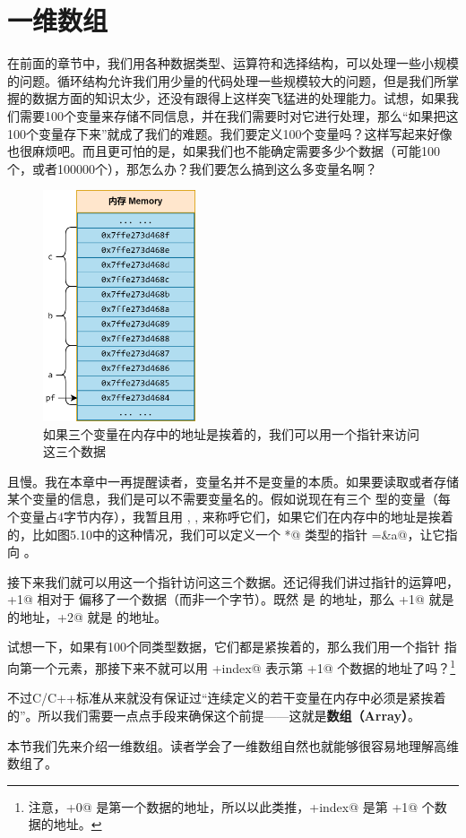 \section{一维数组}
在前面的章节中，我们用各种数据类型、运算符和选择结构，可以处理一些小规模的问题。循环结构允许我们用少量的代码处理一些规模较大的问题，但是我们所掌握的数据方面的知识太少，还没有跟得上这样突飞猛进的处理能力。试想，如果我们需要100个变量来存储不同信息，并在我们需要时对它进行处理，那么``如果把这100个变量存下来''就成了我们的难题。我们要定义100个变量吗？这样写起来好像也很麻烦吧。而且更可怕的是，如果我们也不能确定需要多少个数据（可能100个，或者100000个），那怎么办？我们要怎么搞到这么多变量名啊？\par
\begin{figure}[htbp]
    \centering
    \includegraphics[width=0.4\textwidth]{../images/generalized_parts/05_variables_one_by_one_in_memory.drawio.png}
    \caption{如果三个变量在内存中的地址是挨着的，我们可以用一个指针来访问这三个数据}
\end{figure}
且慢。我在本章中一再提醒读者，变量名并不是变量的本质。如果要读取或者存储某个变量的信息，我们是可以不需要变量名的。假如说现在有三个 \lstinline@float@ 型的变量（每个变量占4字节内存），我暂且用 \lstinline@a@, \lstinline@b@, \lstinline@c@ 来称呼它们，如果它们在内存中的地址是挨着的，比如图5.10中的这种情况，我们可以定义一个 \lstinline@float*@ 类型的指针 \lstinline@pf=&a@，让它指向 \lstinline@a@。\par
接下来我们就可以用这一个指针访问这三个数据。还记得我们讲过指针的运算吧，\lstinline@pf+1@ 相对于 \lstinline@pf@ 偏移了一个数据（而非一个字节）。既然 \lstinline@pf@ 是 \lstinline@a@ 的地址，那么 \lstinline@pf+1@ 就是 \lstinline@b@ 的地址，\lstinline@pf+2@ 就是 \lstinline@c@ 的地址。\par
试想一下，如果有100个同类型数据，它们都是紧挨着的，那么我们用一个指针 \lstinline@p@ 指向第一个元素，那接下来不就可以用 \lstinline@p+index@ 表示第 \lstinline@index+1@ 个数据的地址了吗？\footnote{注意，\lstinline@p+0@ 是第一个数据的地址，所以以此类推，\lstinline@p+index@ 是第 \lstinline@index+1@ 个数据的地址。}\par
不过C/C++标准从来就没有保证过``连续定义的若干变量在内存中必须是紧挨着的''。所以我们需要一点点手段来确保这个前提——这就是\textbf{数组（Array）}。\par
本节我们先来介绍一维数组。读者学会了一维数组自然也就能够很容易地理解高维数组了。\par
